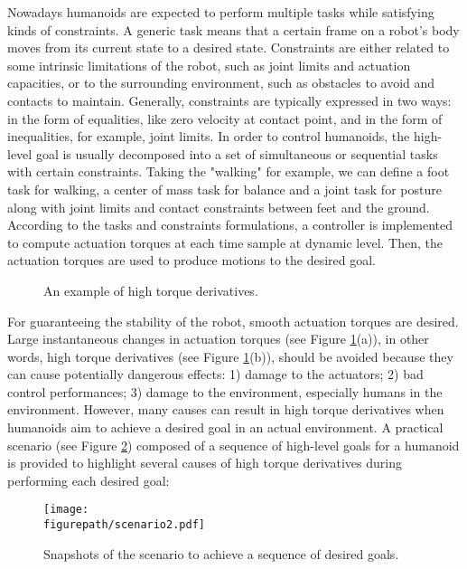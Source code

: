 Nowadays humanoids are expected to perform multiple tasks while satisfying kinds of constraints. A generic task means that a certain frame on a robot's body moves from its current state to a desired state. Constraints are either related to some intrinsic limitations of the robot, such as joint limits and actuation capacities, or to the surrounding environment, such as obstacles to avoid and contacts to maintain. Generally, constraints are typically expressed in two ways: in the form of equalities, like zero velocity at contact point, and in the form of inequalities, for example, joint limits. 
%
In order to control humanoids, the high-level goal is usually decomposed into a set of simultaneous or sequential tasks with certain constraints. Taking the "walking" for example, we can define a foot task for walking, a center of mass task for balance and a joint task for posture along with joint limits and contact constraints between feet and the ground. According to the tasks and constraints formulations, a controller is implemented to compute actuation torques at each time sample at dynamic level. Then, the actuation torques are used to produce motions to the desired goal. 

\begin{figure}[!h]
\centering
{}\quad
{}\quad
\caption{An example of high torque derivatives.}
\label{fig:high torque derivative}
\end{figure}


For guaranteeing the stability of the robot, smooth actuation torques are desired. Large instantaneous changes in actuation torques (see Figure \ref{fig:high torque derivative}(a)), in other words, high torque derivatives (see Figure \ref{fig:high torque derivative}(b)), should be avoided because they can cause potentially dangerous effects: 1) damage to the actuators; 2) bad control performances; 3) damage to the environment, especially humans in the environment. However, many causes can result in high torque derivatives when humanoids aim to achieve a desired goal in an actual environment. A practical scenario (see Figure \ref{fig:scenario}) composed of a sequence of high-level goals for a humanoid is provided to highlight several causes of high torque derivatives during performing each desired goal:

\begin{figure}[!h]
\centering
\texttt{[image: \\figurepath/scenario2.pdf]}
\caption{Snapshots of the scenario to achieve a sequence of desired goals.}
\label{fig:scenario}
\end{figure}

